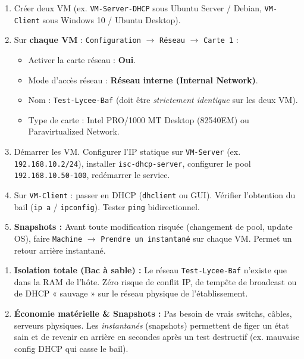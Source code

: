 \documentclass[11pt]{article}
\begin{document}
\begin{exoresolu}
\begin{methode}
\begin{enumerate}
\item Créer deux VM (ex. \texttt{VM-Server-DHCP} sous Ubuntu Server / Debian, \texttt{VM-Client} sous Windows 10 / Ubuntu Desktop).
\item Sur \textbf{chaque VM} : \texttt{Configuration} $\rightarrow$ \texttt{Réseau} $\rightarrow$ \texttt{Carte 1} :
\begin{itemize}
\item Activer la carte réseau : \textbf{Oui}.
\item Mode d'accès réseau : \textbf{Réseau interne (Internal Network)}.
\item Nom : \texttt{Test-Lycee-Baf} (doit être \emph{strictement identique} sur les deux VM).
\item Type de carte : Intel PRO/1000 MT Desktop (82540EM) ou Paravirtualized Network.
\end{itemize}
\item Démarrer les VM. Configurer l'IP statique sur \texttt{VM-Server} (ex. \texttt{192.168.10.2/24}), installer \texttt{isc-dhcp-server}, configurer le pool \texttt{192.168.10.50-100}, redémarrer le service.
\item Sur \texttt{VM-Client} : passer en DHCP (\texttt{dhclient} ou GUI). Vérifier l'obtention du bail (\texttt{ip a} / \texttt{ipconfig}). Tester \texttt{ping} bidirectionnel.
\item \textbf{Snapshots :} Avant toute modification risquée (changement de pool, update OS), faire \texttt{Machine} $\rightarrow$ \texttt{Prendre un instantané} sur chaque VM. Permet un retour arrière instantané.
\end{enumerate}
\end{methode}

\begin{aretenir}
\begin{enumerate}
\item \textbf{Isolation totale (Bac à sable) :} Le réseau \texttt{Test-Lycee-Baf} n'existe que dans la RAM de l'hôte. Zéro risque de conflit IP, de tempête de broadcast ou de DHCP « sauvage » sur le réseau physique de l'établissement.
\item \textbf{Économie matérielle \& Snapshots :} Pas besoin de vrais switchs, câbles, serveurs physiques. Les \emph{instantanés} (snapshots) permettent de figer un état sain et de revenir en arrière en secondes après un test destructif (ex. mauvaise config DHCP qui casse le bail).
\end{enumerate}
\end{aretenir}


\end{exoresolu}
\end{document}
